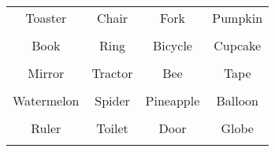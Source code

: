 \documentclass[12pt,a4paper]{article}
\begin{document}
\thispagestyle{empty}
\begin{table}[]
\centering
\Huge
\begin{tabular}{cccc}
 Toaster& Chair& Fork& Pumpkin\\  & & & \\
 Book& Ring& Bicycle& Cupcake\\  & & & \\
 Mirror& Tractor& Bee& Tape\\  & & & \\
 Watermelon& Spider& Pineapple& Balloon\\  & & & \\
 Ruler& Toilet& Door& Globe\\  & & & \\
\end{tabular}
\end{table}
\end{document}
